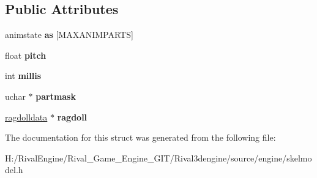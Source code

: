 \subsection*{Public Attributes}
\begin{DoxyCompactItemize}
\item 
\mbox{\label{structskelmodel_1_1animcacheentry_ac28e0853d60f2171861d246b428251f0}} 
animstate {\bfseries as} \mbox{[}M\+A\+X\+A\+N\+I\+M\+P\+A\+R\+TS\mbox{]}
\item 
\mbox{\label{structskelmodel_1_1animcacheentry_a127a9235fef9c158bde2847e7be09ea1}} 
float {\bfseries pitch}
\item 
\mbox{\label{structskelmodel_1_1animcacheentry_a6044d26cdbe012c4ef8866d465c71181}} 
int {\bfseries millis}
\item 
\mbox{\label{structskelmodel_1_1animcacheentry_a284612e43c86dfdb4d94e977cfe9b98d}} 
uchar $\ast$ {\bfseries partmask}
\item 
\mbox{\label{structskelmodel_1_1animcacheentry_a75db1fb3885dae57b9e1f7d799b2fc91}} 
\hyperlink{structragdolldata}{ragdolldata} $\ast$ {\bfseries ragdoll}
\end{DoxyCompactItemize}


The documentation for this struct was generated from the following file\+:\begin{DoxyCompactItemize}
\item 
H\+:/\+Rival\+Engine/\+Rival\+\_\+\+Game\+\_\+\+Engine\+\_\+\+G\+I\+T/\+Rival3dengine/source/engine/skelmodel.\+h\end{DoxyCompactItemize}
